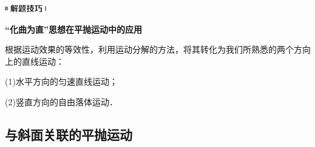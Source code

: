 \begin{center}\includegraphics[width=0.70833in,height=0.125in]{media/image37.png}

\textbf{``化曲为直''思想在平抛运动中的应用}
\end{center}


根据运动效果的等效性，利用运动分解的方法，将其转化为我们所熟悉的两个方向上的直线运动：

(1)水平方向的匀速直线运动；

(2)竖直方向的自由落体运动．

\newpage
\subsection{与斜面关联的平抛运动}

